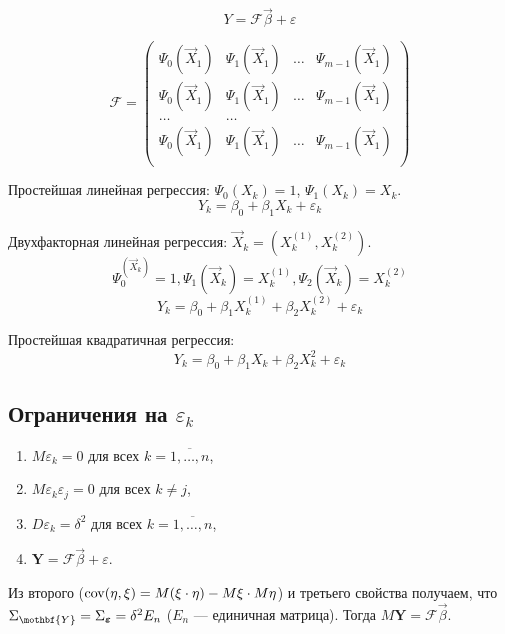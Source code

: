 \[
  Y = \mathcal{F} \vec{\beta} + \varepsilon
\]

\[
  \mathcal{F} = \begin{pmatrix}
    \Psi_0(\vec{X}_1) & \Psi_1(\vec{X}_1) & \dots & \Psi_{m-1} (\vec{X}_1) \\
    \Psi_0(\vec{X}_1) & \Psi_1(\vec{X}_1) & \dots & \Psi_{m-1} (\vec{X}_1) \\
    \dots & \dots \\
    \Psi_0(\vec{X}_1) & \Psi_1(\vec{X}_1) & \dots & \Psi_{m-1} (\vec{X}_1) \\
  \end{pmatrix}
\]

\begin{ex}
  Простейшая линейная регрессия: $\Psi_0(X_k) = 1$, $\Psi_1(X_k) = X_k$.
  \[
    Y_k = \beta_0 + \beta_1 X_k + \varepsilon_k
  \]
\end{ex}
  Двухфакторная линейная регрессия: $\vec{X}_k = (X_k^{(1)}, X_k^{(2)})$.
  \[
    \Psi_0^(\vec{X}_k) = 1, \Psi_1(\vec{X}_k) = X_k^{(1)}, \Psi_2(\vec{X}_k) = X_k^{(2)}
  \]
  \[
    Y_k = \beta_0 + \beta_1 X_k^{(1)} + \beta_2 X_k^{(2)} + \varepsilon_k
  \]
\begin{ex}
  Простейшая квадратичная регрессия:
  \[
    Y_k = \beta_0 + \beta_1 X_k + \beta_2 X_k^2 + \varepsilon_k
  \]
\end{ex}

\subsection{Ограничения на $\varepsilon_k$}

\begin{enumerate}
  \item $M\varepsilon_k = 0$ для всех $ k = \overline{1, \ldots, n} $,
  \item $M\varepsilon_k \varepsilon_j = 0$ для всех $k \neq j$,
  \item $D \varepsilon_k = \delta^2$ для всех $ k = \overline{1, \ldots, n} $,
  \item $\mathbf Y = \mathcal{F} \vec{\beta} + \varepsilon$.
\end{enumerate}
Из второго ($ \operatorname{cov}(\eta, \xi) = M(\xi\cdot\eta) - M\xi \cdot M\eta $) и третьего свойства получаем, что $\Sigma_{\mothbf{Y}} = \Sigma_{\bm\varepsilon} = \delta^2 E_n$
($E_n$ --- единичная матрица).
Тогда $M\mathbf{Y} = \mathcal{F} \vec{\beta}$.

